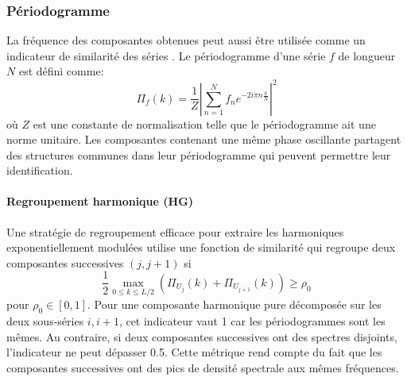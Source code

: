 \documentclass{gretsi}
\begin{document}

\subsubsection{Périodogramme}\label{ssub:per}

La fréquence des composantes obtenues peut aussi être utilisée comme un indicateur de similarité des séries \cite{Golyandina_10_ssa}.
Le périodogramme d'une série $f$ de longueur $N$ est défini comme:
\begin{equation*}
    \Pi_f(k) = \frac{1}{Z}\left|\sum_{n=1}^N f_n e^{-2i\pi n \frac{k}{N}}\right|^2
\end{equation*}
où $Z$ est une constante de normalisation telle que le périodogramme ait une norme unitaire.
Les composantes contenant une même phase oscillante partagent des structures communes dans leur périodogramme qui peuvent permettre leur identification.

\paragraph{Regroupement harmonique (HG)}\label{par:HG}
    Une stratégie de regroupement efficace pour extraire les harmoniques exponentiellement modulées \cite{alexandrov_05_auto} utilise une fonction de similarité qui regroupe deux composantes successives $(j, j+1)$ si 
    \begin{equation*}
        \frac{1}{2}\max_{0\le k \le L/2}\left(\Pi_{U_j}(k) + \Pi_{U_{j+1}}(k)\right) \ge \rho_0 
    \end{equation*}
    pour $\rho_0\in \left[0, 1\right]$.
    Pour une composante harmonique pure décomposée sur les deux sous-séries $i, i+1$, cet indicateur vaut 1 car les périodogrammes sont les mêmes.
    Au contraire, si deux composantes successives ont des spectres disjoints, l'indicateur ne peut dépasser 0.5.
    Cette métrique rend compte du fait que les composantes successives ont des pics de densité spectrale aux mêmes fréquences.
\end{document}
